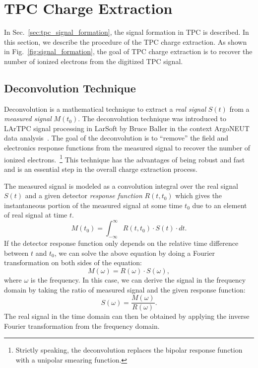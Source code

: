 \section{TPC Charge Extraction}
\label{sec:tpc-signal-calibration}

In Sec.~\ref{sec:tpc_signal_formation}, the signal formation in TPC
is described. In this section, we describe the procedure of the TPC 
charge extraction. As shown in Fig.~\ref{fig:signal_formation}, the 
goal of TPC charge extraction is to recover the number of ionized 
electrons from the digitized TPC signal. 

\subsection{Deconvolution Technique}\label{sec:decon}

Deconvolution is a mathematical technique to extract a \textit{real signal}
$S(t)$ from a \textit{measured signal} $M(t_0)$. The deconvolution technique 
was introduced to LArTPC signal processing in LarSoft by Bruce Baller in the 
context ArgoNEUT data analysis~\cite{bruce}. The goal of the deconvolution is 
to ``remove'' the field and electronics response functions from the measured 
signal to recover the number of ionized electrons.~\footnote{Strictly speaking,
the deconvolution replaces the bipolar response function with a unipolar smearing
function.} This technique has the advantages of being robust and fast and is an 
essential step in the overall charge extraction process. 

The measured signal is modeled as a convolution integral over the real 
signal $S(t)$ and a given detector \textit{response function} $R(t,t_0)$ which gives the
instantaneous portion of the measured signal at some time $t_0$ due to
an element of real signal at time $t$.
\begin{equation}\label{eq:decon_1}
M(t_0) = \int_{-\infty}^{\infty}  R(t,t_0) \cdot S(t) \cdot dt.
\end{equation}
If the detector response function only depends on the relative time 
difference between $t$ and $t_0$, we can solve the above equation by 
doing a Fourier transformation on both sides of the equation:
\begin{equation}
M(\omega) = R(\omega) \cdot S(\omega), 
\end{equation}
where $\omega$ is the frequency. In this case, we can derive the signal in the 
frequency domain by taking the ratio of measured signal and the given
response function:
\begin{equation}\label{eq:decon_2}
S(\omega) = \frac{M(\omega)}{R(\omega)}.
\end{equation}
The real signal in the time domain can then be obtained by applying the 
inverse Fourier transformation from the frequency domain. 

